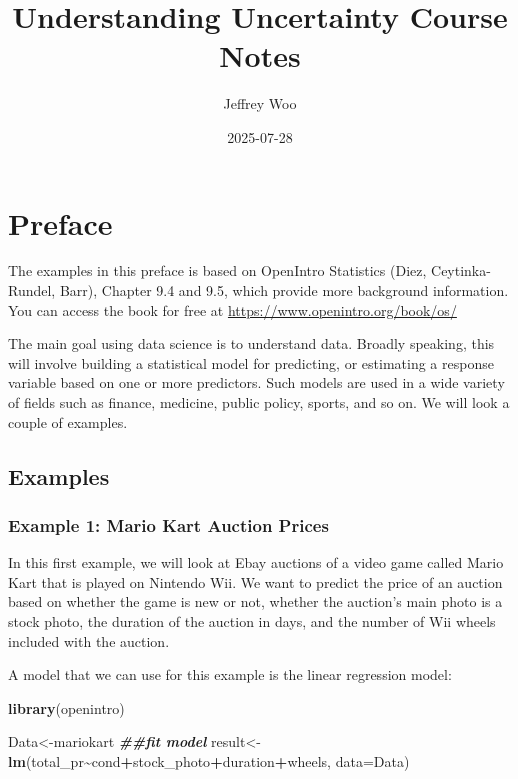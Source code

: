 \documentclass[
]{book}
\title{Understanding Uncertainty Course Notes}
\author{Jeffrey Woo}
\date{2025-07-28}
\newenvironment{Shaded}{\begin{snugshade}}{\end{snugshade}}
\newcommand{\AttributeTok}[1]{\textcolor[rgb]{0.13,0.29,0.53}{#1}}
\newcommand{\DocumentationTok}[1]{\textcolor[rgb]{0.56,0.35,0.01}{\textbf{\textit{#1}}}}
\newcommand{\FunctionTok}[1]{\textcolor[rgb]{0.13,0.29,0.53}{\textbf{#1}}}
\newcommand{\NormalTok}[1]{#1}
\newcommand{\OtherTok}[1]{\textcolor[rgb]{0.56,0.35,0.01}{#1}}
\newcommand{\SpecialCharTok}[1]{\textcolor[rgb]{0.81,0.36,0.00}{\textbf{#1}}}
\begin{document}
\maketitle

{
\setcounter{tocdepth}{1}
\tableofcontents
}
\chapter*{Preface}\label{preface}

The examples in this preface is based on OpenIntro Statistics (Diez, Ceytinka-Rundel, Barr), Chapter 9.4 and 9.5, which provide more background information. You can access the book for free at \url{https://www.openintro.org/book/os/}

The main goal using data science is to understand data. Broadly speaking, this will involve building a statistical model for predicting, or estimating a response variable based on one or more predictors. Such models are used in a wide variety of fields such as finance, medicine, public policy, sports, and so on. We will look a couple of examples.

\section{Examples}\label{examples}

\subsection{Example 1: Mario Kart Auction Prices}\label{example-1-mario-kart-auction-prices}

In this first example, we will look at Ebay auctions of a video game called Mario Kart that is played on Nintendo Wii. We want to predict the price of an auction based on whether the game is new or not, whether the auction's main photo is a stock photo, the duration of the auction in days, and the number of Wii wheels included with the auction.

A model that we can use for this example is the linear regression model:

\begin{Shaded}
\begin{Highlighting}[]
\FunctionTok{library}\NormalTok{(openintro)}

\NormalTok{Data}\OtherTok{\textless{}{-}}\NormalTok{mariokart}
\DocumentationTok{\#\#fit model}
\NormalTok{result}\OtherTok{\textless{}{-}}\FunctionTok{lm}\NormalTok{(total\_pr}\SpecialCharTok{\textasciitilde{}}\NormalTok{cond}\SpecialCharTok{+}\NormalTok{stock\_photo}\SpecialCharTok{+}\NormalTok{duration}\SpecialCharTok{+}\NormalTok{wheels, }\AttributeTok{data=}\NormalTok{Data)}
\end{Highlighting}
\end{Shaded}
\end{document}
